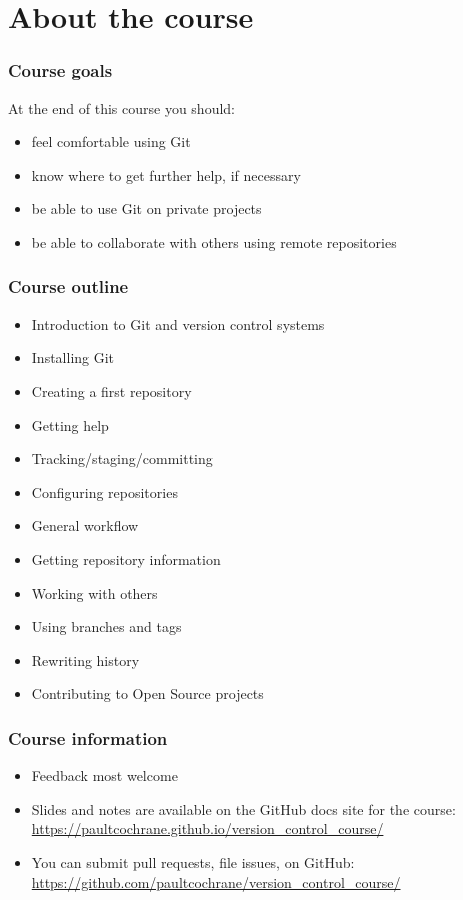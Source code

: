 \section{About the course}

\begin{frame}
\frametitle{Course goals}

At the end of this course you should:

\begin{itemize}
    \item feel comfortable using Git
    \item know where to get further help, if necessary
    \item be able to use Git on private projects
    \item be able to collaborate with others using remote repositories
\end{itemize}
\end{frame}

\begin{frame}
\frametitle{Course outline}
\begin{itemize}
    \item Introduction to Git and version control systems
    \item Installing Git
    \item Creating a first repository
    \item Getting help
    \item Tracking/staging/committing
    \item Configuring repositories
    \item General workflow
    \item Getting repository information
    \item Working with others
    \item Using branches and tags
    \item Rewriting history
    \item Contributing to Open Source projects
\end{itemize}
\end{frame}


\begin{frame}
\frametitle{Course information}
\begin{itemize}
    \item Feedback most welcome
    \item Slides and notes are available on the GitHub docs site for the
        course:\\
        {\footnotesize \url{https://paultcochrane.github.io/version\_control\_course/}}
    \item You can submit pull requests, file issues, on GitHub:\\
        {\footnotesize \url{https://github.com/paultcochrane/version\_control\_course/}}
\end{itemize}
\end{frame}

